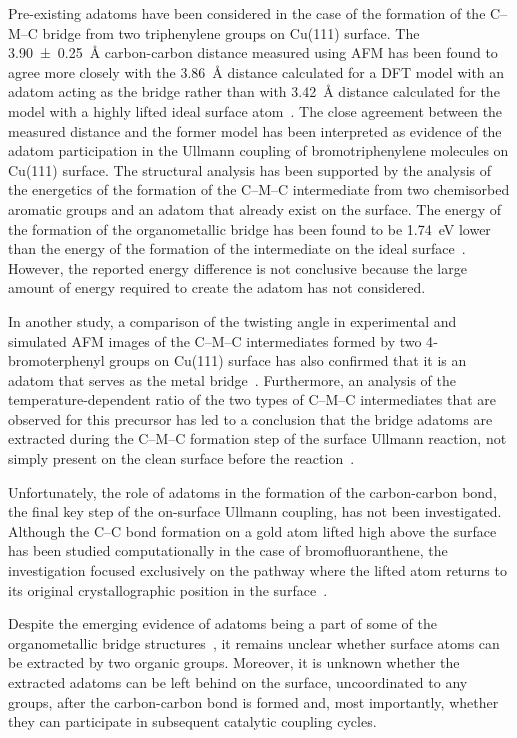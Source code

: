 \documentclass[aps,prb,amsmath,amssymb,11pt]{revtex4-1}
\begin{document}
Pre-existing adatoms have been considered in the case of the formation of the C--M--C bridge from two triphenylene groups on Cu(111) surface. 
The \SI{3.90\pm 0.25}{\angstrom} carbon-carbon distance measured using AFM has been found to agree more closely with the \SI{3.86}{\angstrom} distance calculated for a DFT model with an adatom acting as the bridge rather than with \SI{3.42}{\angstrom} distance calculated for the model with a highly lifted ideal surface atom~\cite{acsnano2017}. 
The close agreement between the measured distance and the former model has been interpreted as evidence of the adatom participation in the Ullmann coupling of bromotriphenylene molecules on Cu(111) surface. 
%
The structural analysis has been supported by the analysis of the energetics of the formation of the C--M--C intermediate from two chemisorbed aromatic groups and an adatom that already exist on the surface. The energy of the formation of the organometallic bridge has been found to be \SI{1.74}{\electronvolt} lower than the energy of the formation of the intermediate on the ideal surface~\cite{acsnano2017}. However, the reported energy difference is not conclusive because the large amount of energy required to create the adatom has not considered.

In another study, a comparison of the twisting angle in experimental and simulated AFM images of the C--M--C intermediates formed by two 4‐bromoterphenyl groups on Cu(111) surface 
has also confirmed that it is an adatom that serves as the metal bridge~\cite{acsnano2019}. Furthermore, an analysis of the temperature-dependent ratio of the two types of C--M--C intermediates that are observed for this precursor has led to a conclusion that the bridge adatoms are extracted during the C--M--C formation step of the surface Ullmann reaction, not simply present on the clean surface before the reaction~\cite{acsnano2019}. 

Unfortunately, the role of adatoms in the formation of the carbon-carbon bond, the final key step of the on-surface Ullmann coupling, has not been investigated. Although the C--C bond formation on a gold atom lifted high above the surface has been studied computationally in the case of bromofluoranthene,
the investigation focused exclusively on the pathway where the lifted atom returns to its original crystallographic position in the surface~\cite{jpcc2018}. 

Despite the emerging evidence of adatoms being a part of some of the organometallic bridge structures~\cite{acsnano2017, acsnano2019}, it remains unclear whether surface atoms can be extracted by two organic groups. Moreover, it is unknown whether the extracted adatoms can be left behind on the surface, uncoordinated to any groups, after the carbon-carbon bond is formed and, most importantly, whether they can participate in subsequent catalytic coupling cycles.
\end{document}
